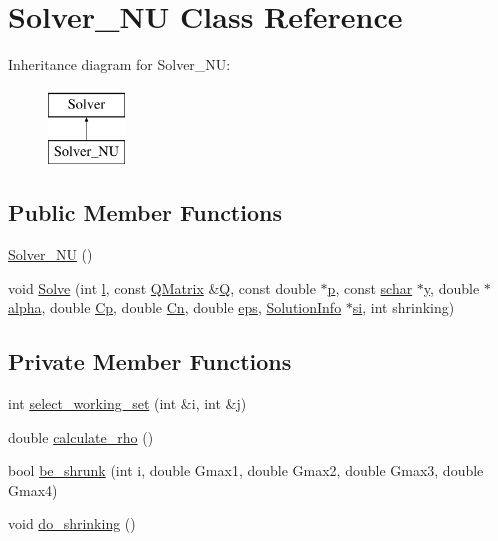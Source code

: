 \hypertarget{classSolver__NU}{}\section{Solver\+\_\+\+NU Class Reference}
\label{classSolver__NU}
Inheritance diagram for Solver\+\_\+\+NU\+:\begin{figure}[H]
\begin{center}
\leavevmode
\includegraphics[height=2.000000cm]{classSolver__NU}
\end{center}
\end{figure}
\subsection*{Public Member Functions}
\begin{DoxyCompactItemize}
\item 
\hyperlink{classSolver__NU_a4f05e99c9939dcdf36840f27b1a9dde7}{Solver\+\_\+\+NU} ()
\item 
void \hyperlink{classSolver__NU_a3852f49023c0032934508156d7a9f132}{Solve} (int \hyperlink{classSolver_a88832d45b6de977b1cbb2afd4c0e494c}{l}, const \hyperlink{classQMatrix}{Q\+Matrix} \&\hyperlink{classSolver_a2d3461718f0570bdc47f5dfb31d61e0a}{Q}, const double $\ast$\hyperlink{classSolver_a882cce072f56679880d409e3e73f7ae8}{p}, const \hyperlink{svm__core_8cpp_a0fd9ce9d735064461bebfe6037026093}{schar} $\ast$\hyperlink{classSolver_a3acc1043d06dedf87f054ff3eea5c426}{y}, double $\ast$\hyperlink{classSolver_a00d7a7cefa2504d41c7db6cd7cc6b428}{alpha}, double \hyperlink{classSolver_a2e45dbea8be469bf8247e14768549dd5}{Cp}, double \hyperlink{classSolver_a38d741d194839fb445f982dd78e0b97b}{Cn}, double \hyperlink{classSolver_a718333cc2c1d40abf9c292a788cba1e5}{eps}, \hyperlink{structSolver_1_1SolutionInfo}{Solution\+Info} $\ast$\hyperlink{classSolver__NU_ab4f51d421dfaec61482401ff5ef0d86c}{si}, int shrinking)
\end{DoxyCompactItemize}
\subsection*{Private Member Functions}
\begin{DoxyCompactItemize}
\item 
int \hyperlink{classSolver__NU_a39577d8d09b1d04500c41a999dfd21e9}{select\+\_\+working\+\_\+set} (int \&i, int \&j)
\item 
double \hyperlink{classSolver__NU_aa4514c004c2a398ae320c6c619f67c98}{calculate\+\_\+rho} ()
\item 
bool \hyperlink{classSolver__NU_ab22738c68164e939d7d0d5de5a5b15f3}{be\+\_\+shrunk} (int i, double Gmax1, double Gmax2, double Gmax3, double Gmax4)
\item 
void \hyperlink{classSolver__NU_a6670a539940f4efdc40d2c9e75a9da1b}{do\+\_\+shrinking} ()
\end{DoxyCompactItemize}
